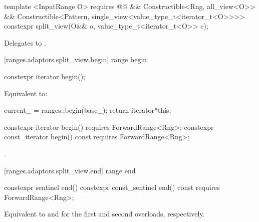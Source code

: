 %
\begin{itemdecl}
template <InputRange O>
requires @@ &&
    Constructible<Rng, all_view<O>> &&
    Constructible<Pattern, single_view<value_type_t<iterator_t<O>>>>
constexpr split_view(O&& o, value_type_t<iterator_t<O>> e);
\end{itemdecl}

\begin{itemdescr}
\pnum
\effects Delegates to
.
\end{itemdescr}

[ranges.adaptors.split_view.begin]{ range begin}

%
\begin{itemdecl}
constexpr iterator begin();
\end{itemdecl}

\begin{itemdescr}
\pnum
\effects Equivalent to:
\begin{codeblock}
current_ = ranges::begin(base_);
return iterator{*this};
\end{codeblock}
\end{itemdescr}

%
\begin{itemdecl}
constexpr iterator begin() requires ForwardRange<Rng>;
constexpr const_iterator begin() const requires ForwardRange<Rng>;
\end{itemdecl}

\begin{itemdescr}
\pnum
\returns {}.
\end{itemdescr}

[ranges.adaptors.split_view.end]{ range end}

%
\begin{itemdecl}
constexpr sentinel end()
constexpr const_sentinel end() const requires ForwardRange<Rng>;
\end{itemdecl}

\begin{itemdescr}
\pnum
\effects Equivalent to  and
 for the first and second overloads,
respectively.
\end{itemdescr}

